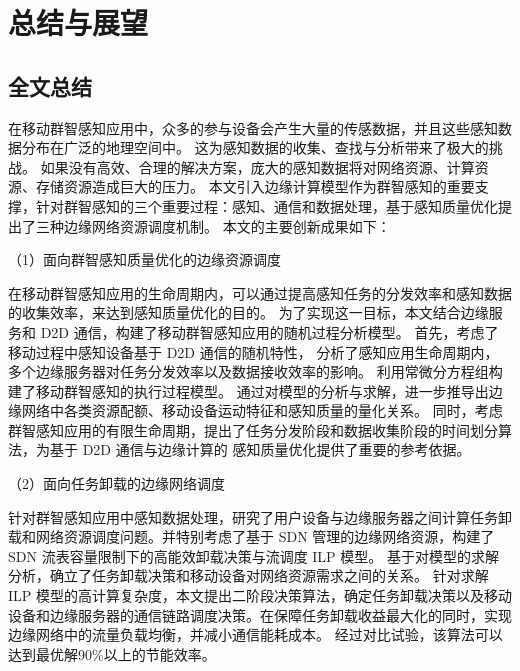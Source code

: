 \chapter{总结与展望}

\section{全文总结}


在移动群智感知应用中，众多的参与设备会产生大量的传感数据，并且这些感知数据分布在广泛的地理空间中。
这为感知数据的收集、查找与分析带来了极大的挑战。
如果没有高效、合理的解决方案，庞大的感知数据将对网络资源、计算资源、存储资源造成巨大的压力。
本文引入边缘计算模型作为群智感知的重要支撑，针对群智感知的三个重要过程：感知、通信和数据处理，基于感知质量优化提出了三种边缘网络资源调度机制。
本文的主要创新成果如下：

（1）面向群智感知质量优化的边缘资源调度

在移动群智感知应用的生命周期内，可以通过提高感知任务的分发效率和感知数据的收集效率，来达到感知质量优化的目的。
为了实现这一目标，本文结合边缘服务和 D2D 通信，构建了移动群智感知应用的随机过程分析模型。
首先，考虑了移动过程中感知设备基于 D2D 通信的随机特性，
分析了感知应用生命周期内，多个边缘服务器对任务分发效率以及数据接收效率的影响。
利用常微分方程组构建了移动群智感知的执行过程模型。
通过对模型的分析与求解，进一步推导出边缘网络中各类资源配额、移动设备运动特征和感知质量的量化关系。
同时，考虑群智感知应用的有限生命周期，提出了任务分发阶段和数据收集阶段的时间划分算法，为基于 D2D 通信与边缘计算的
感知质量优化提供了重要的参考依据。

（2）面向任务卸载的边缘网络调度

针对群智感知应用中感知数据处理，研究了用户设备与边缘服务器之间计算任务卸载和网络资源调度问题。并特别考虑了基于 SDN 管理的边缘网络资源，构建了 SDN 流表容量限制下的高能效卸载决策与流调度 ILP 模型。
基于对模型的求解分析，确立了任务卸载决策和移动设备对网络资源需求之间的关系。
针对求解 ILP 模型的高计算复杂度，本文提出二阶段决策算法，确定任务卸载决策以及移动设备和边缘服务器的通信链路调度决策。在保障任务卸载收益最大化的同时，实现边缘网络中的流量负载均衡，并减小通信能耗成本。
经过对比试验，该算法可以达到最优解90\%以上的节能效率。

